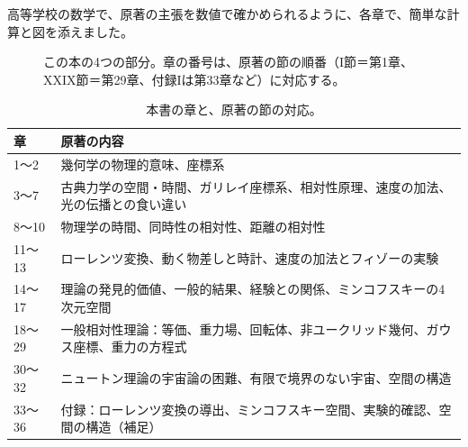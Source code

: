 \documentclass[a4paper,11pt,openany]{ltjsbook}
\begin{document}
高等学校の数学で、原著の主張を数値で確かめられるように、各章で、簡単な計算と図を添えました。

\begin{figure}[htbp]
\centering
{}
\caption{この本の4つの部分。章の番号は、原著の節の順番（I節＝第1章、XXIX節＝第29章、付録Iは第33章など）に対応する。}
\end{figure}

\begin{table}[htbp]
\centering
\small
\begin{tabular}{lp{7.5cm}}
\toprule
章 & 原著の内容\\
\midrule
1〜2 & 幾何学の物理的意味、座標系\\
3〜7 & 古典力学の空間・時間、ガリレイ座標系、相対性原理、速度の加法、光の伝播との食い違い\\
8〜10 & 物理学の時間、同時性の相対性、距離の相対性\\
11〜13 & ローレンツ変換、動く物差しと時計、速度の加法とフィゾーの実験\\
14〜17 & 理論の発見的価値、一般的結果、経験との関係、ミンコフスキーの4次元空間\\
18〜29 & 一般相対性理論：等価、重力場、回転体、非ユークリッド幾何、ガウス座標、重力の方程式\\
30〜32 & ニュートン理論の宇宙論の困難、有限で境界のない宇宙、空間の構造\\
33〜36 & 付録：ローレンツ変換の導出、ミンコフスキー空間、実験的確認、空間の構造（補足）\\
\bottomrule
\end{tabular}
\caption{本書の章と、原著の節の対応。}
\end{table}
\end{document}

